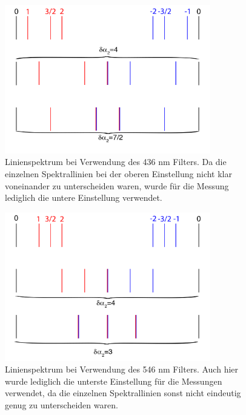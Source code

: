 \documentclass[bigchapter,colorback,accentcolor=tud4b,linedtoc,11pt]{tudreport}
\begin{document}
\begin{figure}[H] 
  \centering
     \includegraphics[width=0.8\textwidth]{img/linienspektrum436.png}
     \caption{Linienspektrum bei Verwendung des 436 nm Filters. Da die einzelnen
       Spektrallinien bei der oberen Einstellung nicht klar voneinander zu
       unterscheiden waren, wurde für die Messung lediglich die untere
       Einstellung verwendet.}
  \label{fig:436nmlines}
\end{figure}

\begin{figure}[H] 
  \centering
     \includegraphics[width=0.8\textwidth]{img/linienspektrum546.png}
     \caption{Linienspektrum bei Verwendung des 546 nm Filters. Auch hier wurde
       lediglich die unterste Einstellung für die Messungen verwendet, da die
       einzelnen Spektrallinien sonst nicht eindeutig genug zu unterscheiden waren.}
  \label{fig:546nmlines}
\end{figure}
\end{document}
